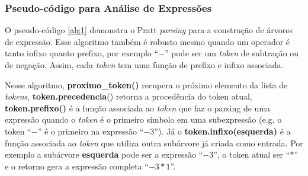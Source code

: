 \documentclass[english, 
               brazil, 
               bsc] %
               {dcomp-abntex2}
\begin{document}
%
%
%
%

\subsubsection{Pseudo-código para Análise de Expressões}

O pseudo-código \ref{alg1}
demonstra o Pratt \textit{parsing} para a construção de árvores de expressão. Esse algoritmo também é robusto mesmo quando um operador é tanto infixo quanto prefixo, por exemplo ``$-$'' pode ser um \textit{token} de subtração ou de negação. Assim, cada \textit{token} tem uma função de prefixo e infixo associada.

Nesse algoritmo, 
\textbf{proximo\_token()} recupera o próximo elemento da lista de \textit{tokens},
\textbf{token.precedencia}() retorna a procedência do token atual, \textbf{token.prefixo()} é a função associada ao \textit{token} que faz o parsing de uma expressão quando o \textit{token} é o primeiro símbolo em uma subexpressão (e.g. o token ``$-$'' é o primeiro na expressão ``$-3$''). Já o \textbf{token.infixo(esquerda)} é a função associada ao \textit{token} que utiliza outra subárvore já criada como entrada. Por exemplo a subárvore \textbf{esquerda} pode ser a expressão ``$-3$'', o token atual ser ``$*$'' e o retorno gera a expressão completa ``$-3 * 1$''.
\end{document}
